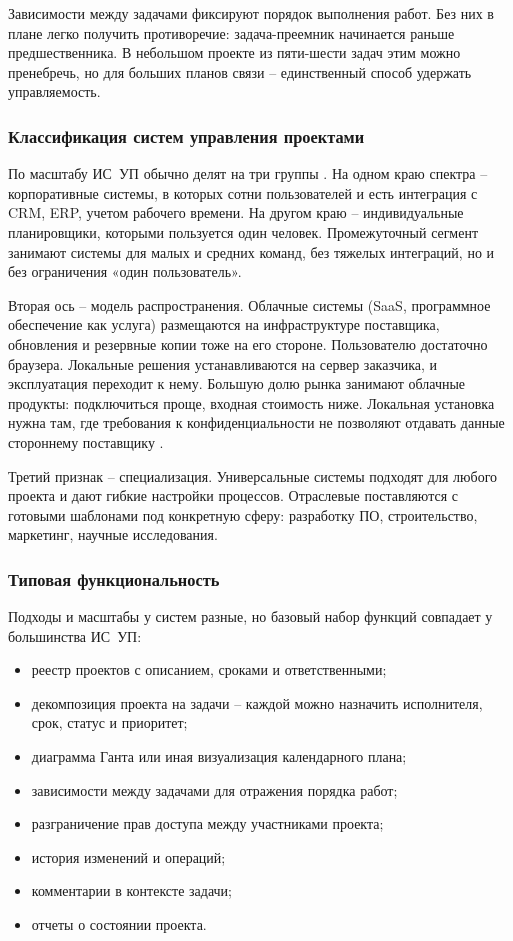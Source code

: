 Зависимости между задачами фиксируют порядок выполнения работ. Без них в плане легко получить противоречие: задача-преемник начинается раньше предшественника. В небольшом проекте из пяти-шести задач этим можно пренебречь, но для больших планов связи -- единственный способ удержать управляемость.

\subsubsection{Классификация систем управления проектами}

По масштабу ИС~УП обычно делят на три группы \cite{safonova_is}. На одном краю спектра -- корпоративные системы, в которых сотни пользователей и есть интеграция с CRM, ERP, учетом рабочего времени. На другом краю -- индивидуальные планировщики, которыми пользуется один человек. Промежуточный сегмент занимают системы для малых и средних команд, без тяжелых интеграций, но и без ограничения «один пользователь».

Вторая ось -- модель распространения. Облачные системы (SaaS, программное обеспечение как услуга) размещаются на инфраструктуре поставщика, обновления и резервные копии тоже на его стороне. Пользователю достаточно браузера. Локальные решения устанавливаются на сервер заказчика, и эксплуатация переходит к нему. Большую долю рынка занимают облачные продукты: подключиться проще, входная стоимость ниже. Локальная установка нужна там, где требования к конфиденциальности не позволяют отдавать данные стороннему поставщику \cite{akhmadullin_pms}.

Третий признак -- специализация. Универсальные системы подходят для любого проекта и дают гибкие настройки процессов. Отраслевые поставляются с готовыми шаблонами под конкретную сферу: разработку ПО, строительство, маркетинг, научные исследования.

\subsubsection{Типовая функциональность}

Подходы и масштабы у систем разные, но базовый набор функций совпадает у большинства ИС~УП:
\begin{itemize}
    \item реестр проектов с описанием, сроками и ответственными;
    \item декомпозиция проекта на задачи -- каждой можно назначить исполнителя, срок, статус и приоритет;
    \item диаграмма Ганта или иная визуализация календарного плана;
    \item зависимости между задачами для отражения порядка работ;
    \item разграничение прав доступа между участниками проекта;
    \item история изменений и операций;
    \item комментарии в контексте задачи;
    \item отчеты о состоянии проекта.
\end{itemize}

